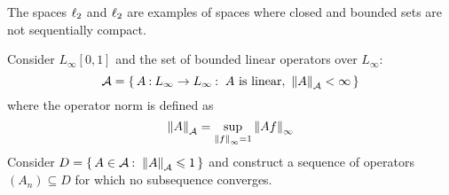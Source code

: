 \documentclass[12pt]{memoir}
\begin{document}
\begin{Ej}
    The spaces $\ell_2$ and $\ell_2$ are examples of spaces where closed and bounded sets are not sequentially compact.\par 
    Consider $L_\infty[0,1]$ and the set of bounded linear operators over $L_\infty$: 
    $$\cA=\set{A\: L_\infty\to L_\infty\:\ A\ \text{is linear},\ \norm{A}_\cA<\infty}$$
    where the operator norm is defined as 
    $$\norm{A}_{\mathcal{A}}=\sup_{\norm{f}_{\infty}=1}\norm{Af}_{\infty}$$
    Consider $D=\{\,A\in\mathcal{A}\mathbin{:}\ \norm{A}_{\mathcal{A}}\leqslant 1\,\}$ and construct a sequence of operators $(A_n)\subseteq D$ for which no subsequence converges.
\end{Ej}
\end{document}
